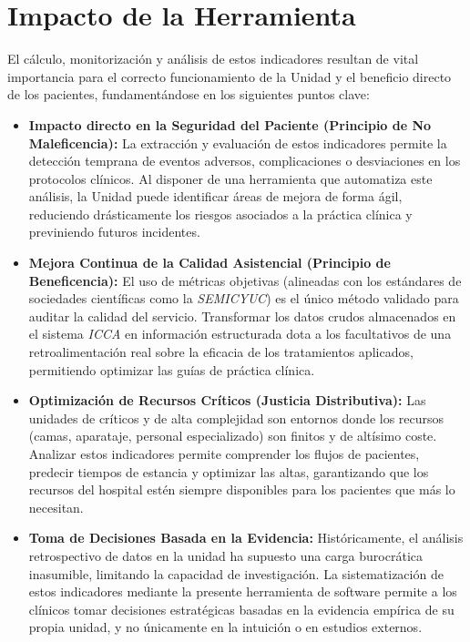 \section{Impacto de la Herramienta}
El cálculo, monitorización y análisis de estos indicadores resultan de vital importancia para el correcto funcionamiento de la Unidad y el beneficio directo de los pacientes, fundamentándose en los siguientes puntos clave:

\begin{itemize}
    \item \textbf{Impacto directo en la Seguridad del Paciente (Principio de No Maleficencia):} La extracción y evaluación de estos indicadores permite la detección temprana de eventos adversos, complicaciones o desviaciones en los protocolos clínicos. Al disponer de una herramienta que automatiza este análisis, la Unidad puede identificar áreas de mejora de forma ágil, reduciendo drásticamente los riesgos asociados a la práctica clínica y previniendo futuros incidentes.

    \item \textbf{Mejora Continua de la Calidad Asistencial (Principio de Beneficencia):} El uso de métricas objetivas (alineadas con los estándares de sociedades científicas como la \textit{SEMICYUC}) es el único método validado para auditar la calidad del servicio. Transformar los datos crudos almacenados en el sistema \textit{ICCA} en información estructurada dota a los facultativos de una retroalimentación real sobre la eficacia de los tratamientos aplicados, permitiendo optimizar las guías de práctica clínica.

    \item \textbf{Optimización de Recursos Críticos (Justicia Distributiva):} Las unidades de críticos y de alta complejidad son entornos donde los recursos (camas, aparataje, personal especializado) son finitos y de altísimo coste. Analizar estos indicadores permite comprender los flujos de pacientes, predecir tiempos de estancia y optimizar las altas, garantizando que los recursos del hospital estén siempre disponibles para los pacientes que más lo necesitan.

    \item \textbf{Toma de Decisiones Basada en la Evidencia:} Históricamente, el análisis retrospectivo de datos en la unidad ha supuesto una carga burocrática inasumible, limitando la capacidad de investigación. La sistematización de estos indicadores mediante la presente herramienta de software permite a los clínicos tomar decisiones estratégicas basadas en la evidencia empírica de su propia unidad, y no únicamente en la intuición o en estudios externos.
    
\end{itemize}

